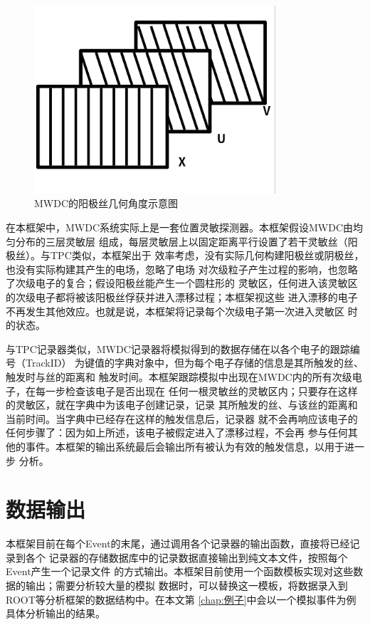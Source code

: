 \documentclass[bachelor,openany,oneside,color]{buaathesis}
\begin{document}
\begin{figure}
	\centering
	\includegraphics[width=0.8\textwidth]{./resource/CEE-MWDC-Layer.png}
	\caption{MWDC的阳极丝几何角度示意图}\label{fig:det:MWDC:Layer}
\end{figure}

在本框架中，MWDC系统实际上是一套位置灵敏探测器。本框架假设MWDC由均匀分布的三层灵敏层
组成，每层灵敏层上以固定距离平行设置了若干灵敏丝（阳极丝）。与TPC类似，本框架出于
效率考虑，没有实际几何构建阳极丝或阴极丝，也没有实际构建其产生的电场，忽略了电场
对次级粒子产生过程的影响，也忽略了次级电子的复合；假设阳极丝能产生一个圆柱形的
灵敏区，任何进入该灵敏区的次级电子都将被该阳极丝俘获并进入漂移过程；本框架视这些
进入漂移的电子不再发生其他效应。也就是说，本框架将记录每个次级电子第一次进入灵敏区
时的状态。

与TPC记录器类似，MWDC记录器将模拟得到的数据存储在以各个电子的跟踪编号（TrackID）
为键值的字典对象中，但为每个电子存储的信息是其所触发的丝、触发时与丝的距离和
触发时间。本框架跟踪模拟中出现在MWDC内的所有次级电子，在每一步检查该电子是否出现在
任何一根灵敏丝的灵敏区内；只要存在这样的灵敏区，就在字典中为该电子创建记录，记录
其所触发的丝、与该丝的距离和当前时间。当字典中已经存在这样的触发信息后，记录器
就不会再响应该电子的任何步骤了：因为如上所述，该电子被假定进入了漂移过程，不会再
参与任何其他的事件。本框架的输出系统最后会输出所有被认为有效的触发信息，以用于进一步
分析。

\section{数据输出}

本框架目前在每个Event的末尾，通过调用各个记录器的输出函数，直接将已经记录到各个
记录器的存储数据库中的记录数据直接输出到纯文本文件，按照每个Event产生一个记录文件
的方式输出。本框架目前使用一个函数模板实现对这些数据的输出；需要分析较大量的模拟
数据时，可以替换这一模板，将数据录入到ROOT等分析框架的数据结构中。在本文第
\ref{chap:例子}中会以一个模拟事件为例具体分析输出的结果。
\end{document}
